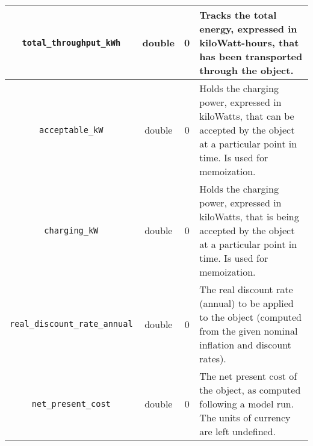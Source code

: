 \documentclass[12pt, letterpaper]{report}
\begin{document}
\begin{table}[H]
{\begin{tabular}{|c|c|c|p{}|}
        \texttt{total\_throughput\_kWh} & {double} & {0} & {Tracks the total energy, expressed in kiloWatt-hours, that has been transported through the object.} \\\hline
        \texttt{acceptable\_kW} & {double} & {0} & {Holds the charging power, expressed in kiloWatts, that can be accepted by the object at a particular point in time. Is used for memoization.} \\\hline
        \texttt{charging\_kW} & {double} & {0} & {Holds the charging power, expressed in kiloWatts, that is being accepted by the object at a particular point in time. Is used for memoization.} \\\hline
        \texttt{real\_discount\_rate\_annual} & {double} & {0} & {The real discount rate (annual) to be applied to the object (computed from the given nominal inflation and discount rates).} \\\hline
        \texttt{net\_present\_cost} & {double} & {0} & {The net present cost of the object, as computed following a model run. The units of currency are left undefined.} \\\hline
    \end{tabular}
    }
    \label{tab:Storage_attributes}
\end{table}
\end{document}
